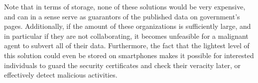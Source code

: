 Note that in terms of storage, none of these solutions would be very expensive, and can in a sense serve as guarantors of the published data on government's pages. Additionally, if the amount of these organizations is sufficiently large, and in particular if they are not collaborating, it becomes unfeasible for a malignant agent to subvert all of their data. Furthermore, the fact that the lightest level of this solution could even be stored on smartphones makes it possible for interested individuals to guard the security certificates and check their veracity later, or effectively detect malicious activities.
